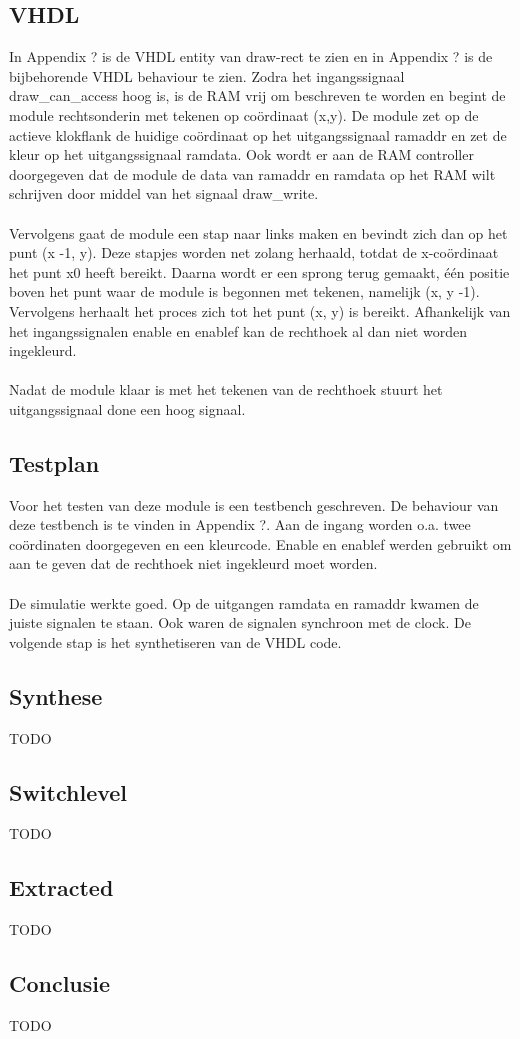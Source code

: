 \documentclass{scrartcl} %
\begin{document}
\subsection{VHDL}
In Appendix ? is de VHDL entity van draw-rect te zien en in Appendix ? is de bijbehorende VHDL behaviour te zien. Zodra het ingangssignaal draw\_can\_access hoog is, is de RAM vrij om beschreven te worden en begint de module rechtsonderin met tekenen op coördinaat (x,y). De module zet op de actieve klokflank de huidige coördinaat op het uitgangssignaal ramaddr en zet de kleur op het uitgangssignaal ramdata. Ook wordt er aan de RAM controller doorgegeven dat de module de data van ramaddr en ramdata op het RAM wilt schrijven door middel van het signaal draw\_write. \\
\\
Vervolgens gaat de module een stap naar links maken en bevindt zich dan op het punt (x -1, y). Deze stapjes worden net zolang herhaald, totdat de x-coördinaat het punt x0 heeft bereikt. Daarna wordt er een sprong terug gemaakt, één positie boven het punt waar de module is begonnen met tekenen, namelijk (x, y -1). Vervolgens herhaalt het proces zich tot het punt (x, y) is bereikt. Afhankelijk van het ingangssignalen enable en enablef kan de rechthoek al dan niet worden ingekleurd.\\
\\
Nadat de module klaar is met het tekenen van de rechthoek stuurt het uitgangssignaal done een hoog signaal.

\subsection{Testplan}
Voor het testen van deze module is een testbench geschreven. De behaviour van deze testbench is te vinden in Appendix ?. Aan de ingang worden o.a. twee coördinaten doorgegeven en een kleurcode. Enable en enablef werden gebruikt om aan te geven dat de rechthoek niet ingekleurd moet worden.\\
\\
De simulatie werkte goed. Op de uitgangen ramdata en ramaddr kwamen de juiste signalen te staan. Ook waren de signalen synchroon met de clock. De volgende stap is het synthetiseren van de VHDL code.

\subsection{Synthese}
TODO

\subsection{Switchlevel}
TODO

\subsection{Extracted}
TODO

\subsection{Conclusie}
TODO
\end{document}
